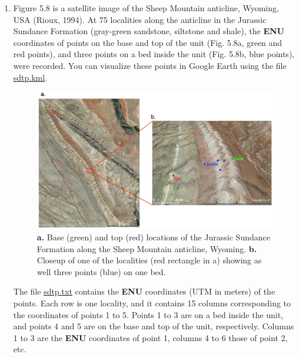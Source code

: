 \documentclass[a4paper , 12pt]{book}
\begin{document}
\begin{enumerate}

    \item Figure 5.8 is a satellite image of the Sheep Mountain anticline, Wyoming, USA (Rioux, 1994). At 75 localities along the anticline in the Jurassic Sundance Formation (gray-green sandstone, siltstone and shale), the \textbf{ENU} coordinates of points on the base and top of the unit (Fig. 5.8a, green and red points), and three points on a bed inside the unit (Fig. 5.8b, blue points), were recorded. You can visualize these points in Google Earth using the file \href{https://github.com/nfcd/compGeo/blob/master/source/data/ch5-exercise1/sdtp.kml}{sdtp.kml}. 
    
    \begin{figure}[ht]
    \centering
    \includegraphics[width=14cm]{ch5f13.pdf}
    \caption{\textbf{a.} Base (green) and top (red) locations of the Jurassic Sundance Formation along the Sheep Mountain anticline, Wyoming. \textbf{b.} Closeup of one of the localities (red rectangle in a) showing as well three points (blue) on one bed.}
    \label{fig: SheepMountain}
    \end{figure}
    
    The file \href{https://github.com/nfcd/compGeo/blob/master/source/data/ch5-exercise1/sdtp.txt}{sdtp.txt} contains the \textbf{ENU} coordinates (UTM in meters) of the points. Each row is one locality, and it contains 15 columns corresponding to the coordinates of points 1 to 5. Points 1 to 3 are on a bed inside the unit, and points 4 and 5 are on the base and top of the unit, respectively. Columns 1 to 3 are the \textbf{ENU} coordinates of point 1, columns 4 to 6 those of point 2, etc. 
    

\end{enumerate}
\end{document}
